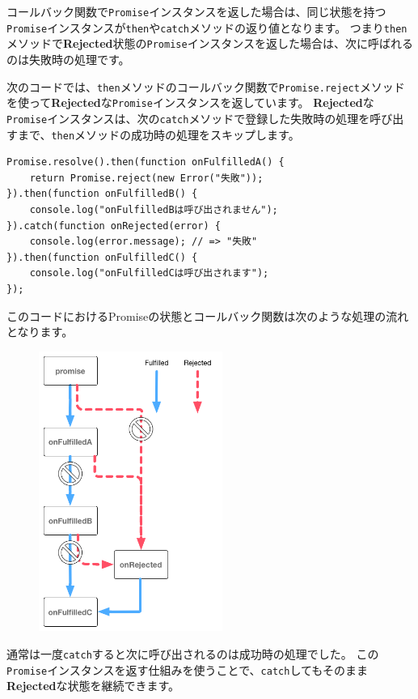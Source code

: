 コールバック関数で\texttt{Promise}インスタンスを返した場合は、同じ状態を持つ\texttt{Promise}インスタンスが\texttt{then}や\texttt{catch}メソッドの返り値となります。
つまり\texttt{then}メソッドで\textbf{Rejected}状態の\texttt{Promise}インスタンスを返した場合は、次に呼ばれるのは失敗時の処理です。

次のコードでは、\texttt{then}メソッドのコールバック関数で\texttt{Promise.reject}メソッドを使って\textbf{Rejected}な\texttt{Promise}インスタンスを返しています。
\textbf{Rejected}な\texttt{Promise}インスタンスは、次の\texttt{catch}メソッドで登録した失敗時の処理を呼び出すまで、\texttt{then}メソッドの成功時の処理をスキップします。

\begin{lstlisting}
Promise.resolve().then(function onFulfilledA() {
    return Promise.reject(new Error("失敗"));
}).then(function onFulfilledB() {
    console.log("onFulfilledBは呼び出されません");
}).catch(function onRejected(error) {
    console.log(error.message); // => "失敗"
}).then(function onFulfilledC() {
    console.log("onFulfilledCは呼び出されます");
});
\end{lstlisting}

このコードにおけるPromiseの状態とコールバック関数は次のような処理の流れとなります。

\begin{figure}[h]
\centering
\includegraphics[width=60mm]{./fig/then-rejected-promise.png}
\end{figure}

通常は一度\texttt{catch}すると次に呼び出されるのは成功時の処理でした。
この\texttt{Promise}インスタンスを返す仕組みを使うことで、\texttt{catch}してもそのまま\textbf{Rejected}な状態を継続できます。

